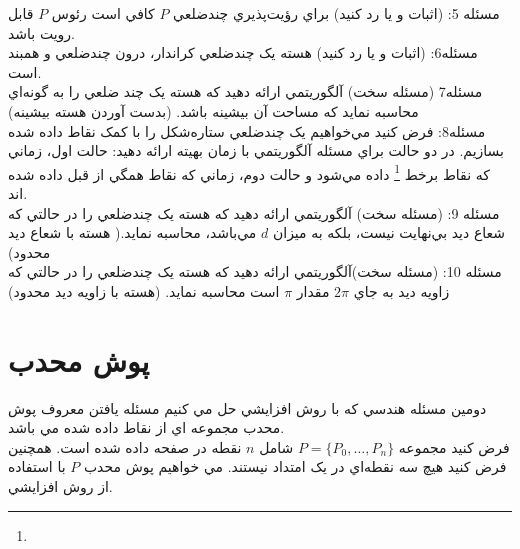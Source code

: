 \documentclass{book}
\begin{document}
مسئله 5: (اثبات و يا رد کنيد)  براي رؤيت‌پذيري چندضلعي $P$  كافي است رئوس $P$ قابل رويت باشد.\\

مسئله6: (اثبات و يا رد کنيد) هسته يک چندضلعي کراندار، درون چندضلعي و همبند است.\\

مسئله7 (مسئله سخت) آلگوريتمي ارائه دهيد که هسته يک چند ضلعي را به گونه‌اي محاسبه نمايد که مساحت آن بيشينه باشد. (بدست آوردن هسته بيشينه)\\

مسئله8: فرض کنيد مي‌خواهيم يک چندضلعي ستاره‌شکل را با کمک نقاط داده شده بسازيم. در دو حالت براي مسئله آلگوريتمي با زمان بهيته ارائه دهيد: حالت اول، زماني که نقاط برخط
\footnote{}
  داده مي‌شود و حالت دوم، زماني که نقاط همگي از قبل داده شده اند.\\
  
مسئله 9: (مسئله سخت) آلگوريتمي  ارائه دهيد که هسته يک چندضلعي را در حالتي که شعاع ديد بي‌نهايت نيست، بلکه به ميزان $d$ مي‌باشد، محاسبه نمايد.( هسته با شعاع ديد محدود)\\

مسئله 10: (مسئله سخت)آلگوريتمي ارائه دهيد که هسته يک چندضلعي را در حالتي که زاويه ديد به جاي $2\pi$ مقدار $\pi$ است محاسبه نمايد. (هسته با زاويه ديد محدود)
\section*{پوش محدب}
دومين مسئله هندسي که با روش افزايشي حل مي کنيم مسئله يافتن معروف پوش محدب مجموعه اي از نقاط داده شده مي باشد.\\
فرض کنيد مجموعه 
$P=\{P_{0},\dots ,P_{n} \}$
 شامل $n$ نقطه در صفحه داده شده است. همچنين فرض کنيد هيچ سه نقطه‌اي در يک امتداد نيستند. مي خواهيم  پوش محدب $P$ با استفاده از روش افزايشي.
\end{document}
